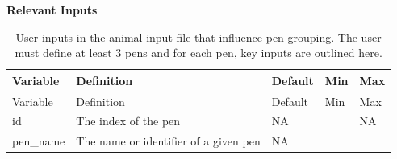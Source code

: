 \documentclass[
  letterpaper,
  oneside,
  openany]{scrbook}
\begin{document}
\textbf{Relevant Inputs}

\begin{longtable}[]{@{}
  >{\raggedright\arraybackslash}p{}
  >{\raggedright\arraybackslash}p{}
  >{\raggedright\arraybackslash}p{}
  >{\raggedright\arraybackslash}p{}
  >{\raggedright\arraybackslash}p{}@{}}
\caption{User inputs in the animal input file that influence pen
grouping. The user must define at least 3 pens and for each pen, key
inputs are outlined here.}\label{tbl-animal-grp-inputs}\tabularnewline
\toprule\noalign{}
\begin{minipage}[b]{\linewidth}\raggedright
Variable
\end{minipage} & \begin{minipage}[b]{\linewidth}\raggedright
Definition
\end{minipage} & \begin{minipage}[b]{\linewidth}\raggedright
Default
\end{minipage} & \begin{minipage}[b]{\linewidth}\raggedright
Min
\end{minipage} & \begin{minipage}[b]{\linewidth}\raggedright
Max
\end{minipage} \\
\midrule\noalign{}
\endfirsthead
\toprule\noalign{}
\begin{minipage}[b]{\linewidth}\raggedright
Variable
\end{minipage} & \begin{minipage}[b]{\linewidth}\raggedright
Definition
\end{minipage} & \begin{minipage}[b]{\linewidth}\raggedright
Default
\end{minipage} & \begin{minipage}[b]{\linewidth}\raggedright
Min
\end{minipage} & \begin{minipage}[b]{\linewidth}\raggedright
Max
\end{minipage} \\
\midrule\noalign{}
\endhead
\bottomrule\noalign{}
\endlastfoot
id & The index of the pen & NA & 0 & NA \\
pen\_name & The name or identifier of a given pen & NA & & \\

\end{longtable}
\end{document}
